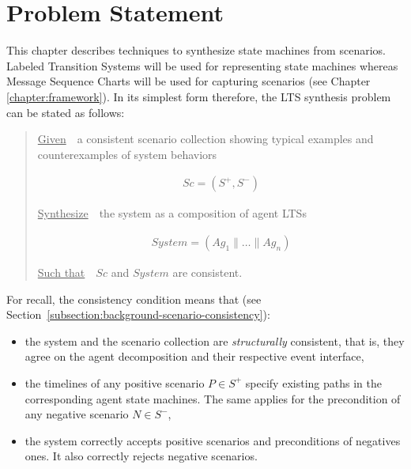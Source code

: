 \section{Problem Statement\label{section:inductive-problem-statement}}

This chapter describes techniques to synthesize state machines from scenarios. Labeled Transition Systems will be used for representing state machines whereas Message Sequence Charts will be used for capturing scenarios (see Chapter \ref{chapter:framework}). In its simplest form therefore, the LTS synthesis problem can be stated as follows:

\begin{quotation}
\noindent \underline{Given}~~a consistent scenario collection showing typical examples and counterexamples of system behaviors

\vspace{-0.7cm}
\begin{align*}
Sc = (S^+,S^-)
\end{align*}

\vspace{-0.2cm}
\noindent \underline{Synthesize}~~the system as a composition of agent LTSs

\vspace{-0.7cm}
\begin{align*}
System = (Ag_1 \parallel \ldots \parallel Ag_n)
\end{align*}

\vspace{-0.2cm}
\noindent \underline{Such that}~~$Sc$ and $System$ are consistent.
\end{quotation}

\noindent For recall, the consistency condition means that (see Section~\ref{subsection:background-scenario-consistency}):

\begin{itemize}
\item the system and the scenario collection are \emph{structurally} consistent, that is, they agree on the agent decomposition and their respective event interface,
\item the timelines of any positive scenario $P \in S^+$ specify existing paths in the corresponding agent state machines. The same applies for the precondition of any negative scenario $N \in S^-$,
\item the system correctly accepts positive scenarios and preconditions of negatives ones. It also correctly rejects negative scenarios.
\end{itemize}




